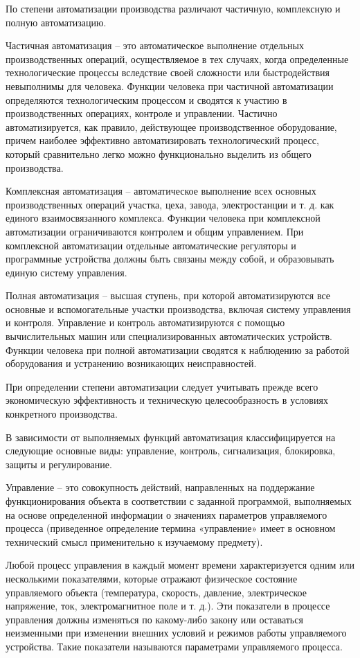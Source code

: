 По степени автоматизации производства различают частичную, комплексную и полную автоматизацию.

Частичная автоматизация -- это автоматическое выполнение отдельных производственных операций, осуществляемое в тех случаях, когда определенные технологические процессы вследствие своей сложности или быстродействия невыполнимы для человека. Функции человека при частичной автоматизации определяются технологическим процессом и сводятся к участию в производственных операциях, контроле и управлении. Частично автоматизируется, как правило, действующее производственное оборудование, причем наиболее эффективно автоматизировать технологический процесс, который сравнительно легко можно функционально выделить из общего производства.

Комплексная автоматизация -- автоматическое выполнение всех основных производственных операций участка, цеха, завода, электростанции и т. д. как единого взаимосвязанного комплекса. Функции человека при комплексной автоматизации ограничиваются контролем и общим управлением. При комплексной автоматизации отдельные автоматические регуляторы и программные устройства должны быть связаны между собой, и образовывать единую систему управления.

Полная автоматизация -- высшая ступень, при которой автоматизируются все основные и вспомогательные участки производства, включая систему управления и контроля. Управление и контроль автоматизируются с помощью вычислительных машин или специализированных автоматических устройств. Функции человека при полной автоматизации сводятся к наблюдению за работой оборудования и устранению возникающих неисправностей.

При определении степени автоматизации следует учитывать прежде всего экономическую эффективность и техническую целесообразность в условиях конкретного производства.

В зависимости от выполняемых функций автоматизация классифицируется на следующие основные виды: управление, контроль, сигнализация, блокировка, защиты и регулирование.

Управление -- это совокупность действий, направленных на поддержание функционирования объекта в соответствии с заданной программой, выполняемых на основе определенной информации о значениях параметров управляемого процесса (приведенное определение термина «управление» имеет в основном технический смысл применительно к изучаемому предмету).

Любой процесс управления в каждый момент времени характеризуется одним или несколькими показателями, которые отражают физическое состояние управляемого объекта (температура, скорость, давление, электрическое напряжение, ток, электромагнитное поле и т. д.). Эти показатели в процессе управления должны изменяться по какому-либо закону или оставаться неизменными при изменении внешних условий и режимов работы управляемого устройства. Такие показатели называются параметрами управляемого процесса.

